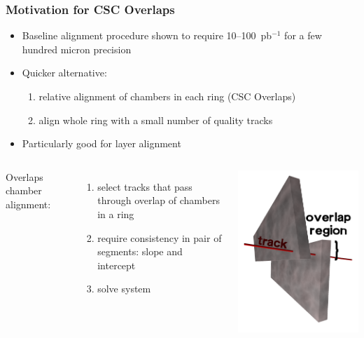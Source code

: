 \documentclass[compress]{beamer}
\begin{document}
\begin{frame}
\frametitle{Motivation for CSC Overlaps}
\begin{itemize}
\item Baseline alignment procedure shown to require 10--100~pb$^{-1}$ for a few hundred micron precision
\item Quicker alternative:
\begin{enumerate}\setlength{\itemsep}{0.1 cm}
\item relative alignment of chambers in each ring (CSC Overlaps)
\item align whole ring with a small number of quality tracks
\end{enumerate}
\item Particularly good for layer alignment
\end{itemize}

\begin{columns}
Overlaps chamber alignment:
\begin{enumerate}\setlength{\itemsep}{0 cm}
\item select tracks that pass through overlap of chambers in a ring
\item require consistency in pair of segments: slope and intercept
\item solve system
\end{enumerate}

\includegraphics[width=\linewidth]{overlaps.png}


\end{columns}
\end{frame}
\end{document}
